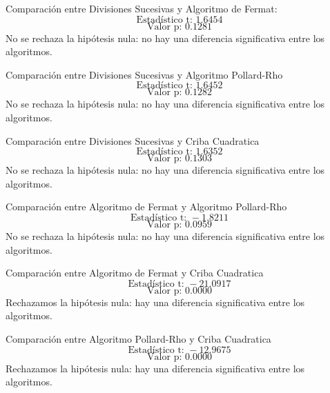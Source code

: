     Comparación entre Divisiones Sucesivas y Algoritmo de Fermat:
    \[
        \text{Estadístico t: } 1.6454
    \]
    \[
        \text{Valor p: } 0.1281
    \]
    No se rechaza la hipótesis nula: no hay una diferencia significativa entre los algoritmos.


    Comparación entre Divisiones Sucesivas y Algoritmo Pollard-Rho
    \[
        \text{Estadístico t: } 1.6452
    \]
    \[
        \text{Valor p: } 0.1282
    \]
    No se rechaza la hipótesis nula: no hay una diferencia significativa entre los algoritmos.

    Comparación entre Divisiones Sucesivas y Criba Cuadratica
    \[
        \text{Estadístico t: } 1.6352
    \]
    \[
        \text{Valor p: } 0.1303
    \]
    No se rechaza la hipótesis nula: no hay una diferencia significativa entre los algoritmos.

    Comparación entre Algoritmo de Fermat y Algoritmo Pollard-Rho
    \[
        \text{Estadístico t: } -1.8211
    \]
    \[
        \text{Valor p: } 0.0959
    \]
    No se rechaza la hipótesis nula: no hay una diferencia significativa entre los algoritmos.

    Comparación entre Algoritmo de Fermat y Criba Cuadratica
    \[
        \text{Estadístico t: } -21.0917
    \]
    \[
        \text{Valor p: } 0.0000
    \]
    Rechazamos la hipótesis nula: hay una diferencia significativa entre los algoritmos.

    Comparación entre Algoritmo Pollard-Rho y Criba Cuadratica
    \[
        \text{Estadístico t: } -12.9675
    \]
    \[
        \text{Valor p: } 0.0000
    \]
    Rechazamos la hipótesis nula: hay una diferencia significativa entre los algoritmos.
